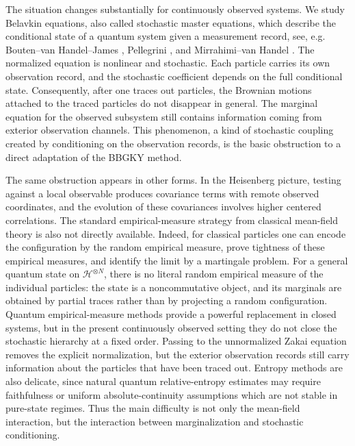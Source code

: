 \documentclass[10pt,a4paper,reqno]{amsart}
\numberwithin{equation}{section}
\theoremstyle{plain}
\theoremstyle{definition}
\theoremstyle{remark}
\newcommand{\HH}{\mathcal H}
\newcommand{\1}{\mathbf 1}
\begin{document}
The situation changes substantially for continuously observed systems.  We
study Belavkin equations, also called stochastic master equations, which
describe the conditional state of a quantum system given a measurement record,  
see, e.g.  Bouten--van Handel--James \cite{bouten2007}, Pellegrini
\cite{pellegrini2008}, and Mirrahimi--van Handel
\cite{mirrahimivanhandel2007}.  The normalized equation is nonlinear and
stochastic.  Each particle carries its own observation record, and the
stochastic coefficient depends on the full conditional state.  Consequently,
after one traces out particles, the Brownian motions attached to the traced
particles do not disappear in general.  The marginal equation for the observed
subsystem still contains information coming from exterior observation
channels.  This phenomenon, a kind of stochastic coupling created by conditioning on the
observation records, is the basic obstruction to a direct adaptation of the
BBGKY method.



The same obstruction appears in other forms.  In the Heisenberg picture,
testing against a local observable produces covariance terms with remote
observed coordinates, and the evolution of these covariances involves higher
centered correlations.  The standard empirical-measure strategy from
classical mean-field theory is also not directly available.  Indeed, for
classical particles one can encode the configuration by the random empirical
measure,  prove tightness of these empirical measures, and identify the limit by a
martingale problem.  For a general quantum state on \(\HH^{\otimes N}\),
there is no literal random empirical measure of the individual particles:
the state is a noncommutative object, and its marginals are obtained by
partial traces rather than by projecting a random configuration.  Quantum
empirical-measure methods provide a powerful replacement in closed systems,
but in the present continuously observed setting they do not close the
stochastic hierarchy at a fixed order.  Passing to the unnormalized Zakai
equation removes the explicit normalization, but the exterior observation
records still carry information about the particles that have been traced out.
Entropy methods are also delicate, since natural quantum relative-entropy
estimates may require faithfulness or uniform absolute-continuity assumptions
which are not stable in pure-state regimes.  Thus the main difficulty is not
only the mean-field interaction, but the interaction between marginalization
and stochastic conditioning.
\end{document}
